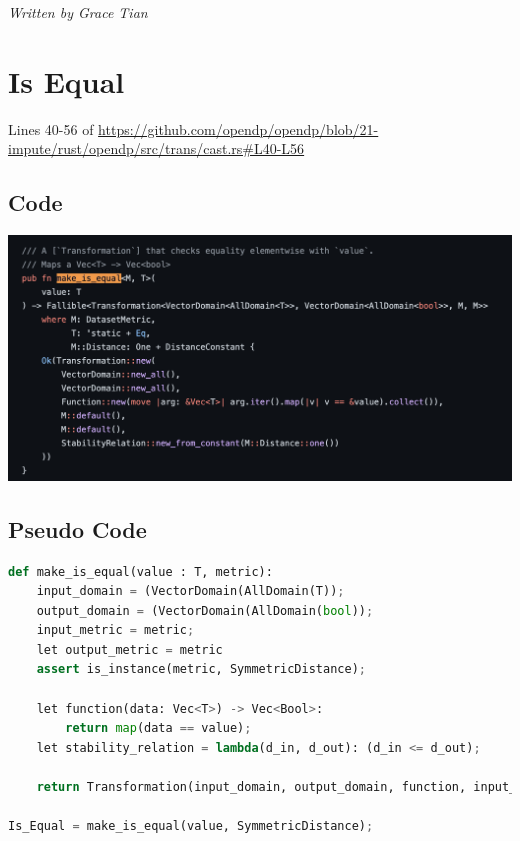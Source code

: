 \documentclass[11pt,a4paper]{article}
\newcommand{\silvia}[1]{{ {\color{blue}{(silvia)~#1}}}}
\begin{document}
\vspace{0.2cm}
\emph{Written by Grace Tian}
\vspace{0.2cm}


\section{Is Equal} 
Lines 40-56 of \url{https://github.com/opendp/opendp/blob/21-impute/rust/opendp/src/trans/cast.rs#L40-L56}

\subsection{Code}

\includegraphics[width=\textwidth]{make_is_equal.png}


\subsection{Pseudo Code}

\begin{lstlisting}[language=Python]
def make_is_equal(value : T, metric):
    input_domain = (VectorDomain(AllDomain(T));
    output_domain = (VectorDomain(AllDomain(bool));
    input_metric = metric; 
    let output_metric = metric
    assert is_instance(metric, SymmetricDistance);
    
    let function(data: Vec<T>) -> Vec<Bool>: 
        return map(data == value);
    let stability_relation = lambda(d_in, d_out): (d_in <= d_out);
    
    return Transformation(input_domain, output_domain, function, input_metric, output_metric, stability_relation)

Is_Equal = make_is_equal(value, SymmetricDistance);
\end{lstlisting}
\end{document}

